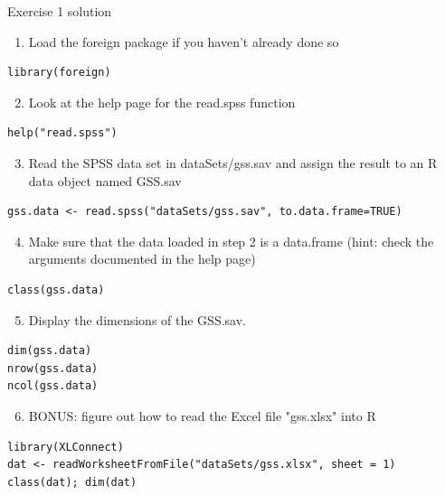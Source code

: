 \documentclass[table,smaller]{beamer}
\begin{document}
\begin{frame}[fragile,label=sec-9-2]{Exercise 1 solution}
 \begin{enumerate}
\setcounter{enumi}{0}
\item Load the foreign package if you haven't already done so
\end{enumerate}
\begin{verbatim}
library(foreign)
\end{verbatim}

\begin{enumerate}
\setcounter{enumi}{1}
\item Look at the help page for the read.spss function
\end{enumerate}
\begin{verbatim}
help("read.spss")
\end{verbatim}

\begin{enumerate}
\setcounter{enumi}{2}
\item Read the SPSS data set in dataSets/gss.sav and assign the result to an R data object named GSS.sav
\end{enumerate}
\begin{verbatim}
gss.data <- read.spss("dataSets/gss.sav", to.data.frame=TRUE)
\end{verbatim}

\begin{enumerate}
\setcounter{enumi}{3}
\item Make sure that the data loaded in step 2 is a data.frame (hint: check the arguments documented in the help page)
\end{enumerate}
\begin{verbatim}
class(gss.data)
\end{verbatim}

\begin{enumerate}
\setcounter{enumi}{4}
\item Display the dimensions of the GSS.sav.
\end{enumerate}
\begin{verbatim}
dim(gss.data)
nrow(gss.data)
ncol(gss.data)
\end{verbatim}

\begin{enumerate}
\setcounter{enumi}{5}
\item BONUS: figure out how to read the Excel file "gss.xlsx" into R
\end{enumerate}
\begin{verbatim}
library(XLConnect)
dat <- readWorksheetFromFile("dataSets/gss.xlsx", sheet = 1)
class(dat); dim(dat)
\end{verbatim}
\end{frame}
\end{document}
